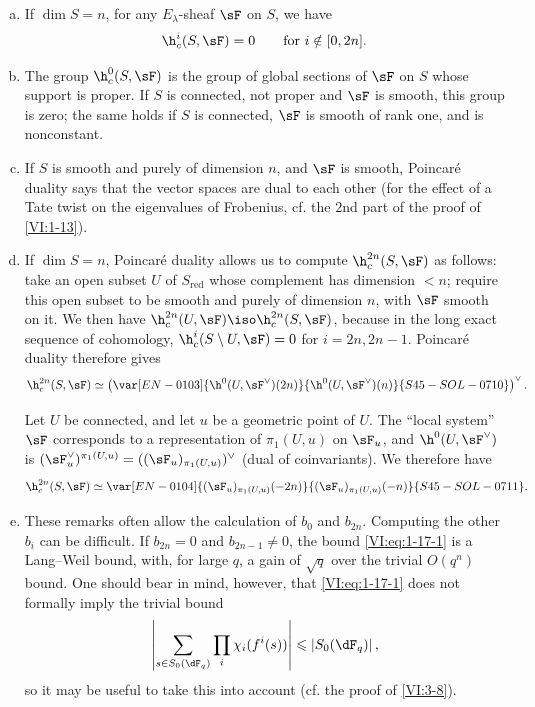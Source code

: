 \begin{enumerate}[a)]
  \item If $\dim S=n$, for any $E_\lambda$-sheaf $\sF$ on $S$, we have 
    \[
      \h_c^i(S,\sF) = 0 \qquad \text{for $i\notin [0,2n]$.}
    \]
  \item The group $\h_c^0(S,\sF)$ is the group of global sections of $\sF$ 
    on $S$ whose support is proper. If $S$ is connected, not proper and 
    $\sF$ is smooth, this group is zero; the same holds if $S$ is connected, 
    $\sF$ is smooth of rank one, and is nonconstant.
  \item If $S$ is smooth and purely of dimension $n$, and $\sF$ is smooth, 
    Poincaré duality says that the vector spaces 
     are dual to each other 
    (for the effect of a Tate twist on the eigenvalues of Frobenius, 
    cf. the $2$nd part of the proof of \ref{VI:1-13}).
  \item If $\dim S=n$, Poincaré duality allows us to compute 
    $\h_c^{2n}(S,\sF)$ as follows: take an open subset $U$ of $S_\text{red}$ 
    whose complement has dimension $<n$; require this open subset to be smooth and 
    purely of dimension $n$, with $\sF$ smooth on it. We then have 
    $\h_c^{2n}(U,\sF) \iso \h_c^{2n}(S,\sF)$, because in the long exact sequence 
    of cohomology, $\h_c^i(S\setminus U,\sF) = 0$ for $i=2n,2n-1$. 
    Poincaré duality therefore gives 
    \[
      \h_c^{2n}(S,\sF) \simeq \left(\var[EN-0103]{\h^0(U,\sF^\vee)(2n)}{\h^0(U,\sF^\vee)(n)}{S45-SOL-0710}\right)^\vee \text{.}
    \]
    
    Let $U$ be connected, and let $u$ be a geometric point of $U$. The 
    ``local system'' $\sF$ corresponds to a representation of 
    $\pi_1(U,u)$ on $\sF_u$, and $\h^0(U,\sF^\vee)$ is 
    $(\sF_u^\vee)^{\pi_1(U,u)}=((\sF_u)_{\pi_1(U,u)})^\vee$ (dual of 
    coinvariants). We therefore have 
\[
      \h_c^{2n}(S,\sF) \simeq \var[EN-0104]{(\sF_u)_{\pi_1(U,u)}(-2n)}{(\sF_u)_{\pi_1(U,u)}(-n)}{S45-SOL-0711} \text{.}
    \]
  \item These remarks often allow the calculation of $b_0$ and $b_{2n}$. 
    Computing the other $b_i$ can be difficult. If $b_{2n}=0$ and 
    $b_{2n-1}\ne 0$, the bound \eqref{VI:eq:1-17-1} is a Lang--Weil bound, 
    with, for large $q$, a gain of $\sqrt q$ over the 
    trivial $O(q^n)$ bound. One should bear in mind, however, that 
    \eqref{VI:eq:1-17-1} does not formally imply the trivial bound 
    \[
      \left|\sum_{s\in S_0(\dF_q)} \prod_i \chi_i(f^i(s))\right| \leqslant \left| S_0(\dF_q)\right| \text{,}
    \]
    so it may be useful to take this into account (cf. the proof of \ref{VI:3-8}). 
\end{enumerate}

